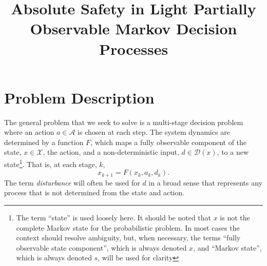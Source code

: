 \documentclass{article}
\title{Absolute Safety in Light Partially Observable Markov Decision Processes}
\newcommand{\aspace}{\ensuremath{\mathcal{A}} }
\begin{document}
\maketitle

% 
% 
% 

\section{Problem Description}


The general problem that we seek to solve is a multi-stage decision problem where an action $a \in \aspace$ is chosen at each step.
The system dynamics are determined by a function $F$, which maps a fully observable component of the state, $x \in \mathcal{X}$, the action, and a non-deterministic input, $d \in \mathcal{D}(x)$, to a new state\footnote{The term ``state'' is used loosely here. It should be noted that $x$ is not the complete Markov state for the probabilistic problem. In most cases the context should resolve ambiguity, but, when necessary, the terms ``fully observable state component'', which is always denoted $x$, and ``Markov state'', which is always denoted $s$, will be used for clarity}.
That is, at each stage, $k$,
\begin{equation}
    x_{k+1} = F(x_k, a_k, d_k) \text{.}
\end{equation}
The term \emph{disturbance} will often be used for $d$ in a broad sense that represents any process that is not determined from the state and action.
\end{document}
